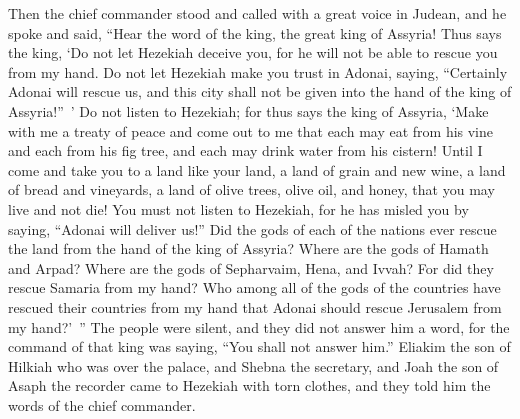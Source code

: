 \begin{biblechapter}
\verse Then the chief commander stood and called with a great voice in Judean, and he spoke and said, “Hear the word of the king, the great king of Assyria!
\verse Thus says the king, ‘Do not let Hezekiah deceive you, for he will not be able to rescue you from my hand.
\verse Do not let Hezekiah make you trust in Adonai, saying, “Certainly Adonai will rescue us, and this city shall not be given into the hand of the king of Assyria!” ’
\verse Do not listen to Hezekiah; for thus says the king of Assyria, ‘Make with me a treaty of peace and come out to me that each may eat from his vine and each from his fig tree, and each may drink water from his cistern!
\verse Until I come and take you to a land like your land, a land of grain and new wine, a land of bread and vineyards, a land of olive trees, olive oil, and honey, that you may live and not die! You must not listen to Hezekiah, for he has misled you by saying, “Adonai will deliver us!”
\verse Did the gods of each of the nations ever rescue the land from the hand of the king of Assyria?
\verse Where are the gods of Hamath and Arpad? Where are the gods of Sepharvaim, Hena, and Ivvah? For did they rescue Samaria from my hand?
\verse Who among all of the gods of the countries have rescued their countries from my hand that Adonai should rescue Jerusalem from my hand?’ ”
\verse The people were silent, and they did not answer him a word, for the command of that king was saying, “You shall not answer him.”
\verse Eliakim the son of Hilkiah who was over the palace, and Shebna the secretary, and Joah the son of Asaph the recorder came to Hezekiah with torn clothes, and they told him the words of the chief commander.
\end{biblechapter}


